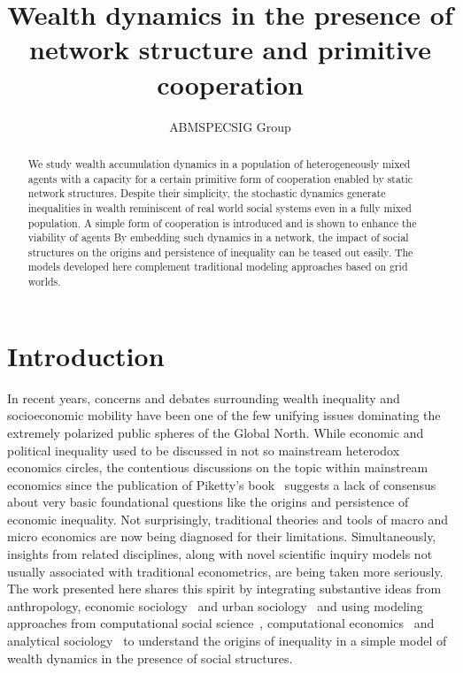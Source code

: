 \documentclass[sigconf]{acmart}
\author{ABMSPECSIG Group}
\title{Wealth dynamics in the presence of network structure and primitive cooperation}
\begin{document}
\maketitle
\begin{abstract}
We study wealth accumulation dynamics in a population of heterogeneously mixed agents with a capacity for a certain primitive form of cooperation enabled by static network structures. Despite their simplicity, the stochastic dynamics generate inequalities in wealth reminiscent of real world social systems even in a fully mixed population. A simple form of cooperation is introduced and is shown to enhance the viability of agents By embedding such dynamics in a network, the impact of social structures on the origins and persistence of inequality can be teased out easily. The models developed here complement traditional modeling approaches based on grid worlds.   

\end{abstract}
\section{Introduction}
In recent years, concerns and debates surrounding wealth inequality and socioeconomic mobility have been one of the few unifying issues dominating the extremely polarized public spheres of the Global North. While economic and political inequality used to be discussed in not so mainstream heterodox economics circles, the contentious discussions on the topic within mainstream economics since the publication of Piketty's book~\cite{piketty2017capital} suggests a lack of consensus about very basic foundational questions like the origins and persistence of economic inequality. Not surprisingly, traditional theories and tools of macro and micro economics are now being diagnosed for their limitations. Simultaneously, insights from related disciplines, along with novel scientific inquiry models not usually associated with traditional econometrics, are being taken more seriously. The work presented here shares this spirit by integrating substantive ideas from anthropology, economic sociology~\cite{granovetter2017society} and urban sociology~\cite{sampson2012great} and using modeling approaches from computational social science~\cite{hedstrom2018}, computational economics~\cite{tesfatsion} and analytical sociology~\cite{hedstrom2011oxford} to understand the origins of inequality in a simple model of wealth dynamics in the presence of social structures.    
\end{document}
